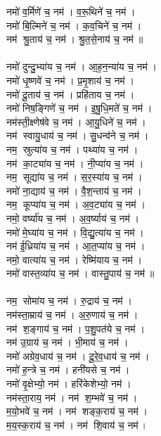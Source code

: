 नमो॑ व॒र्मिणे॑ च॒ नम॑। व॒रू॒थिने॑ च॒ नम॑। \\
नमो॑ बि॒ल्मिने॑ च॒ नम॑। क॒व॒चिने॑ च॒ नम॑। \\
नम॑ श्रु॒ताय॑ च॒ नम॑। श्रु॒त॒से॒नाय॑ च॒ नम॑॥ \\
\\
नमो॑ दुन्दु॒भ्या॑य च॒ नम॑। आ॒ह॒न॒न्या॑य च॒ नम॑। \\
नमो॑ धृ॒ष्णवे॑ च॒ नम॑। प्र॒मृ॒शाय॑ च॒ नम॑।\\
नमो॑ दू॒ताय॑ च॒ नम॑। प्रहि॑ताय च॒ नम॑। \\
नमो॑ निष॒ङ्गिणे॑ च॒ नम॑। इ॒षु॒धि॒मते॑ च॒ नम॑।\\
नम॑स्ती॒क्ष्णेष॑वे च॒ नम॑। आ॒यु॒धिने॑ च॒ नम॑। \\
नम॑ स्वायु॒धाय॑ च॒ नम॑। सु॒धन्व॑ने च॒ नम॑।\\
नम॒ स्रुत्या॑य च॒ नम॑। पथ्या॑य च॒ नम॑। \\
नम॑ का॒ट्या॑य च॒ नम॑। नी॒प्या॑य च॒ नम॑।\\
नम॒ सूद्या॑य च॒ नम॑। स॒र॒स्या॑य च॒ नम॑। \\
नमो॑ ना॒द्याय॑ च॒ नम॑। वै॒श॒न्ताय॑ च॒ नम॑।  \\
नम॒ कूप्या॑य च॒ नम॑। अ॒व॒ट्या॑य च॒ नम॑। \\
नमो॒ वर्ष्या॑य च॒ नम॑। अ॒व॒र्ष्याय॑ च॒ नम॑। \\
नमो॑ मे॒घ्या॑य च॒ नम॑। वि॒द्यु॒त्या॑य च॒ नम॑।\\
नम॑ ई॒ध्रिया॑य च॒ नम॑। आ॒त॒प्या॑य च॒ नम॑।\\
नमो॒ वात्या॑य च॒ नम॑। रेष्मि॑याय च॒ नम॑। \\
नमो॑ वास्त॒व्या॑य च॒ नम॑। वास्तु॒पाय॑ च॒ नम॑॥ \\
\\
नम॒ सोमा॑य च॒ नम॑। रु॒द्राय॑ च॒ नम॑। \\
नम॑स्ता॒म्राय॑ च॒ नम॑। अ॒रु॒णाय॑ च॒ नम॑।\\
नम॑ श॒ङ्गाय॑ च॒ नम॑। प॒शु॒पत॑ये च॒ नम॑। \\
नम॑ उ॒ग्राय॑ च॒ नम॑। भी॒माय॑ च॒ नम॑। \\
नमो॑ अग्रेव॒धाय॑ च॒ नम॑। दू॒रे॒व॒धाय॑ च॒ नम॑।\\
नमो॑ ह॒न्त्रे च॒ नम॑। हनी॑यसे च॒ नम॑। \\
नमो॑ वृ॒क्षेभ्यो॒ नम॑। हरि॑केशेभ्यो॒ नम॑।\\
नम॑स्ता॒राय॒ नम॑। नम॑ श॒म्भवे॑ च॒ नम॑। \\
म॒यो॒भवे॑ च॒ नम॑। नम॑ शङ्क॒राय॑ च॒ नम॑। \\
म॒य॒स्क॒राय॑ च॒ नम॑। नम॑ शि॒वाय॑  च॒ नम॑। \\
